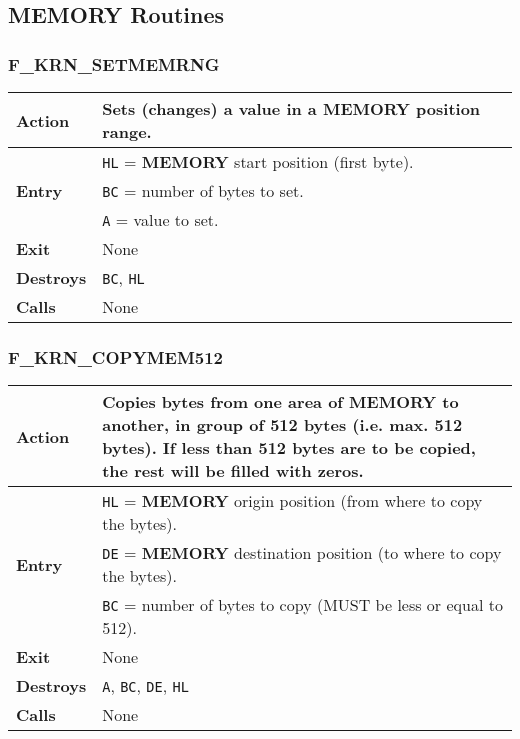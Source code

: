 \subsection{MEMORY Routines}

    \subsubsection{F\_KRN\_SETMEMRNG}
    \label{func:fkrnsetmemrng}
    \begin{tabular}{l p{9cm}}
        \hline\textbf{Action}
        & Sets (changes) a value in a \textbf{MEMORY} position range.\\
        \hline\multirow[t]{3}{4em}{\textbf{Entry}}
        & \texttt{HL} = \textbf{MEMORY} start position (first byte).\\
        & \texttt{BC} = number of bytes to set.\\
        & \texttt{A} = value to set.\\
        \hline\textbf{Exit} & None\\
        \hline\textbf{Destroys} & \texttt{BC}, \texttt{HL}\\
        \hline\textbf{Calls} & None\\
        \hline
    \end{tabular}

    \subsubsection{F\_KRN\_COPYMEM512}
    \label{func:fkrncopymem512}
    \begin{tabular}{l p{9cm}}
        \hline\textbf{Action}
        & Copies bytes from one area of \textbf{MEMORY} to another, in group
        of 512 bytes (i.e. max. 512 bytes). If less than 512 bytes are to be
        copied, the rest will be filled with zeros.\\
        \hline\multirow[t]{3}{4em}{\textbf{Entry}}
        & \texttt{HL} = \textbf{MEMORY} origin position (from where to copy
        the bytes).\\
        & \texttt{DE} = \textbf{MEMORY} destination position (to where to
        copy the bytes).\\
        & \texttt{BC} = number of bytes to copy (MUST be less or equal to
        512).\\
        \hline\textbf{Exit} & None\\
        \hline\textbf{Destroys} & \texttt{A}, \texttt{BC}, \texttt{DE},
        \texttt{HL}\\
        \hline\textbf{Calls} & None\\
        \hline
    \end{tabular}

